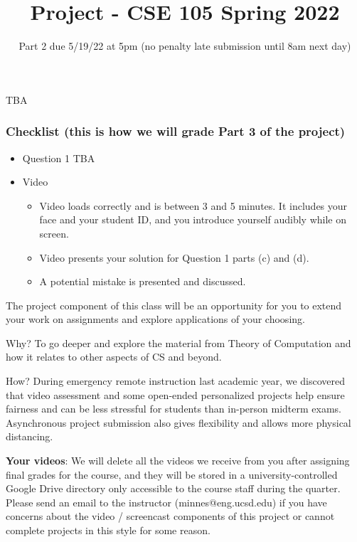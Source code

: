 \documentclass[12pt, oneside]{article}
\begin{document}
TBA


\subsubsection*{Checklist (this is how we will grade Part 3 of the project)}
\begin{itemize}
    \item Question 1 TBA
\item Video
    \begin{itemize}
        \item Video loads correctly and is between 3 and 5 minutes. It includes your face and your student ID, 
        and you introduce yourself audibly while on screen.
        \item Video presents your solution for Question 1 parts (c) and (d).
        \item A potential mistake is presented and discussed.
    \end{itemize}
\end{itemize}
\newpage

\title{Project - CSE 105 Spring 2022}
\date{Part 2 due 5/19/22 at 5pm (no penalty late submission until 8am next day)}


\maketitle
\thispagestyle{fancy}

\vspace{-30pt}

 The project component of this class will be an opportunity for you to extend your work on 
 assignments and explore applications of your choosing. 
 
 Why?  To go deeper and explore the material from Theory of Computation and how it relates to 
 other aspects of CS and beyond. 
 
 How?  During emergency remote instruction last academic year, we discovered that video 
 assessment and some open-ended personalized projects help ensure fairness and can be less 
 stressful for students than in-person midterm exams. Asynchronous project submission also 
 gives flexibility and allows more physical distancing. 
 
 {\bf Your videos}: We will delete all the videos we receive from you after assigning final grades for 
 the course, and they will be stored in a university-controlled Google Drive directory only 
 accessible to the course staff during the quarter. Please send an email to the instructor 
 (minnes@eng.ucsd.edu) if you have concerns about the video / screencast components of this 
 project or cannot complete projects in this style for some reason. 
 
\end{document}
